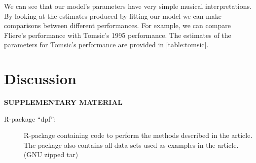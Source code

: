 \documentclass[12pt]{article}
\begin{document}
We can see that our model's parameters have very simple musical interpretations. By looking at the estimates produced by fitting our model we can make comparisons between different performances. For example, we can compare Fliere's performance with Tomsic's 1995 performance. The estimates of the parameters for Tomsic's performance are provided in \ref{table:tomsic}.

\section{Discussion}




\bigskip
\begin{center}
{\large\bf SUPPLEMENTARY MATERIAL}
\end{center}

\begin{description}

\item[R-package ``dpf'':] R-package containing code to perform the
  methods described in the article. The package also contains all data
  sets used as examples in the article. (GNU zipped tar)

\end{description}






\end{document}
